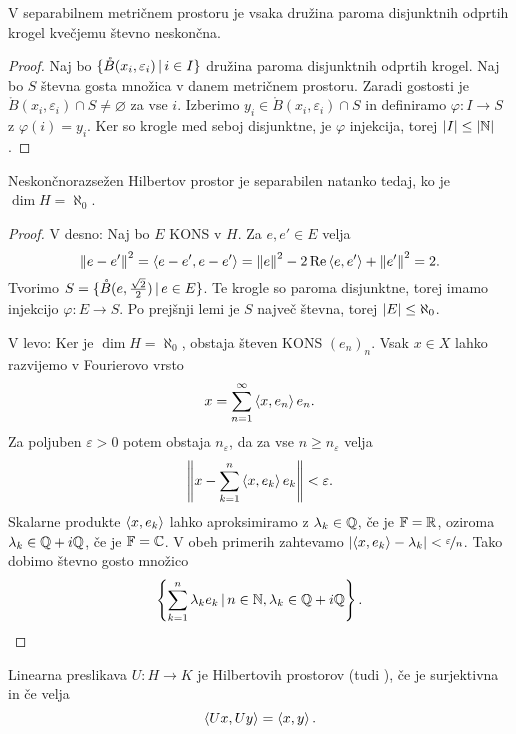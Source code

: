 \begin{lema}
  V separabilnem metričnem prostoru je vsaka družina paroma disjunktnih odprtih
  krogel kvečjemu števno neskončna.
\end{lema}

\begin{proof}
  Naj bo $\{ \mathring{B}(x_i, \varepsilon_i) \,|\, i \in I \}$ družina paroma
  disjunktnih odprtih krogel.
  Naj bo $S$ števna gosta množica v danem metričnem prostoru.
  Zaradi gostosti je $\mathring{B}(x_i, \varepsilon_i) \cap S \ne \varnothing$
  za vse $i$.
  Izberimo $y_i \in \mathring{B}(x_i, \varepsilon_i) \cap S$ in definiramo
  $\varphi: I \to S$ z $\varphi(i) = y_i$.
  Ker so krogle med seboj disjunktne, je $\varphi$ injekcija, torej $\left| I \right| \le
  \left| \mathbb{N} \right|$.
\end{proof}

\begin{trditev}
  Neskončnorazsežen Hilbertov prostor je separabilen natanko tedaj, ko je $\dim
  H = \aleph_0$.
\end{trditev}

\begin{proof}
  V desno:
  Naj bo $E$ KONS v $H$.
  Za $e, e' \in E$ velja
  \[
	\left\lVert e-e'\right\rVert^2 = \left< e-e', e-e' \right> = \left\lVert e\right\rVert^2 - 2 \operatorname{Re} \left< e, e' \right> +
	\left\lVert e'\right\rVert^2 = 2.
  \]
  Tvorimo $S = \{ \mathring{B}(e, \frac{\sqrt{2}}{2}) \,|\, e \in E\}$.
  Te krogle so paroma disjunktne, torej imamo injekcijo $\varphi: E \to S$.
  Po prejšnji lemi je $S$ največ števna, torej $\left| E \right| \le \aleph_0$.

  V levo:
  Ker je $\dim H = \aleph_0$, obstaja števen KONS $(e_n)_n$.
  Vsak $x \in X$ lahko razvijemo v Fourierovo vrsto
  \[
	x = \sum_{n =1}^\infty \left< x, e_n \right> e_n.
  \]
  Za poljuben $\varepsilon > 0$ potem obstaja $n_\varepsilon$, da za vse $n \ge
  n_\varepsilon$ velja
  \[
	\left\lVert x - \sum_{k=1}^n \left< x, e_k \right> e_k\right\rVert < \varepsilon.
  \]
  Skalarne produkte $\left< x, e_k \right>$ lahko aproksimiramo z $\lambda_k \in \mathbb{Q}$, če
  je $\mathbb{F} = \mathbb{R}$, oziroma $\lambda_k \in \mathbb{Q} + i \mathbb{Q}$, če je $\mathbb{F} = \mathbb{C}$.
  V obeh primerih zahtevamo $\left| \left< x, e_k \right> - \lambda_k \right| <
  \nicefrac{\varepsilon}{n}$.
  Tako dobimo števno gosto množico
  \[
	\left\{ \sum_{k=1}^n \lambda_k e_k \,|\, n \in \mathbb{N}, \lambda_k \in \mathbb{Q} + i \mathbb{Q}
	\right\}.
	\qedhere
  \]
\end{proof}

\begin{definicija}
  Linearna preslikava $U: H \to K$ je  Hilbertovih
  prostorov (tudi ), če je surjektivna in če velja
  \[
	\left< Ux, Uy \right> = \left< x,y \right>.
  \]
\end{definicija}

